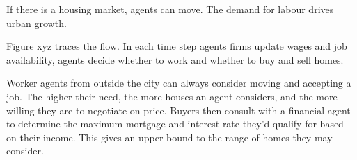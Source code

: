  If there is a housing market, agents can move. %
The demand for labour drives urban growth. %
 
Figure xyz traces the flow. In each time step agents firms update wages and job availability, agents decide whether to work and whether to buy and sell homes.


 
Worker agents from outside the city can always consider moving and accepting a job. %
% 
% 
The higher their need, the more houses an agent considers, and the more willing they are to negotiate on price. %
Buyers then consult with a financial agent to determine the maximum mortgage and interest rate they'd qualify for based on their income. This gives an upper bound to the range of homes they may consider. 

